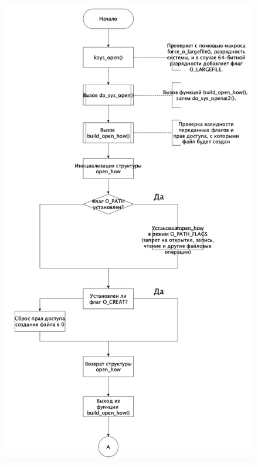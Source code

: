 \documentclass[a4paper,12pt]{article}
\begin{document}
	\begin{figure}[h!]
		\begin{center}
			{\includegraphics[scale = 0.8]{0.png}}
			\label{0}
		\end{center}
	\end{figure}
	
\end{document}
